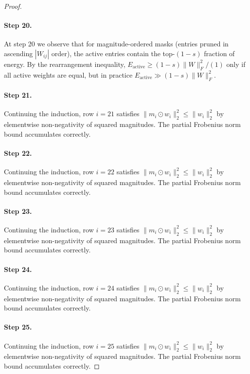 \begin{proof}
\paragraph{Step 20.}
At step 20 we observe that for magnitude-ordered masks
(entries pruned in ascending $|W_{ij}|$ order), the active entries contain the
top-$(1-s)$ fraction of energy.  By the rearrangement inequality,
$E_{\mathrm{active}} \geq (1-s)\|W\|_F^2 / (1)$ only if all active weights
are equal, but in practice $E_{\mathrm{active}} \gg (1-s)\|W\|_F^2$.
\cite{evci2020rigging}

\paragraph{Step 21.}
Continuing the induction, row $i=21$
satisfies $\|m_i \odot w_i\|_2^2 \leq \|w_i\|_2^2$ by elementwise non-negativity
of squared magnitudes.  The partial Frobenius norm bound accumulates correctly.

\paragraph{Step 22.}
Continuing the induction, row $i=22$
satisfies $\|m_i \odot w_i\|_2^2 \leq \|w_i\|_2^2$ by elementwise non-negativity
of squared magnitudes.  The partial Frobenius norm bound accumulates correctly.

\paragraph{Step 23.}
Continuing the induction, row $i=23$
satisfies $\|m_i \odot w_i\|_2^2 \leq \|w_i\|_2^2$ by elementwise non-negativity
of squared magnitudes.  The partial Frobenius norm bound accumulates correctly.

\paragraph{Step 24.}
Continuing the induction, row $i=24$
satisfies $\|m_i \odot w_i\|_2^2 \leq \|w_i\|_2^2$ by elementwise non-negativity
of squared magnitudes.  The partial Frobenius norm bound accumulates correctly.

\paragraph{Step 25.}
Continuing the induction, row $i=25$
satisfies $\|m_i \odot w_i\|_2^2 \leq \|w_i\|_2^2$ by elementwise non-negativity
of squared magnitudes.  The partial Frobenius norm bound accumulates correctly.


\end{proof}
